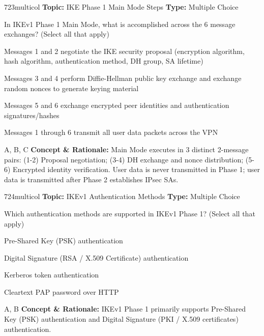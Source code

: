 \begin{qcard}{723}{multicol}
\textcolor{darkslate!75}{\small\textbf{Topic:} IKE Phase 1 Main Mode Steps \hfill \textbf{Type:} Multiple Choice}\vspace{0.4em}\par
In IKEv1 Phase 1 Main Mode, what is accomplished across the 6 message exchanges? (Select all that apply)
\begin{qoptions}
\item Messages 1 and 2 negotiate the IKE security proposal (encryption algorithm, hash algorithm, authentication method, DH group, SA lifetime)
\item Messages 3 and 4 perform Diffie-Hellman public key exchange and exchange random nonces to generate keying material
\item Messages 5 and 6 exchange encrypted peer identities and authentication signatures/hashes
\item Messages 1 through 6 transmit all user data packets across the VPN
\end{qoptions}
\end{qcard}
\nopagebreak
\begin{explainbox}{A, B, C}
\textbf{Concept \& Rationale:} Main Mode executes in 3 distinct 2-message pairs: (1-2) Proposal negotiation; (3-4) DH exchange and nonce distribution; (5-6) Encrypted identity verification. User data is never transmitted in Phase 1; user data is transmitted after Phase 2 establishes IPsec SAs.
\end{explainbox}

\begin{qcard}{724}{multicol}
\textcolor{darkslate!75}{\small\textbf{Topic:} IKEv1 Authentication Methods \hfill \textbf{Type:} Multiple Choice}\vspace{0.4em}\par
Which authentication methods are supported in IKEv1 Phase 1? (Select all that apply)
\begin{qoptions}
\item Pre-Shared Key (PSK) authentication
\item Digital Signature (RSA / X.509 Certificate) authentication
\item Kerberos token authentication
\item Cleartext PAP password over HTTP
\end{qoptions}
\end{qcard}
\nopagebreak
\begin{explainbox}{A, B}
\textbf{Concept \& Rationale:} IKEv1 Phase 1 primarily supports Pre-Shared Key (PSK) authentication and Digital Signature (PKI / X.509 certificates) authentication.
\end{explainbox}

